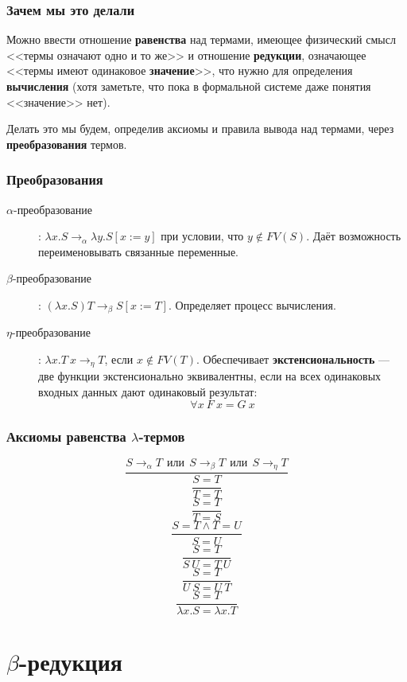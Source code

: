 \documentclass[xetex,mathserif,serif]{beamer}
\begin{document}
    \begin{frame}
        \frametitle{Зачем мы это делали}
        Можно ввести отношение \textbf{равенства} над термами, имеющее физический смысл 
        <<термы означают одно и то же>> и отношение \textbf{редукции}, означающее <<термы имеют 
        одинаковое \textbf{значение}>>, что нужно для определения \textbf{вычисления} (хотя заметьте, что пока в
        формальной системе даже понятия <<значение>> нет).
        
        Делать это мы будем, определив аксиомы и правила вывода над термами, через \textbf{преобразования}
        термов.
    \end{frame}
        
    \begin{frame}
        \frametitle{Преобразования}
        \begin{description}
            \item [$\alpha$-преобразование]: $\lambda x.S \rightarrow_\alpha 
                    \lambda y.S[x := y]$ при условии, что $y \notin FV(S)$. 
                    Даёт возможность переименовывать связанные переменные.
            \item [$\beta$-преобразование]: $(\lambda x.S) T \rightarrow_\beta S[x := T]$.
                    Определяет процесс вычисления.
            \item [$\eta$-преобразование]: $\lambda x.T\ x \rightarrow_\eta T$, 
                    если $x \notin FV(T)$. Обеспечивает	\textbf{экстенсиональность} 
                    --- две функции экстенсионально эквивалентны, если на всех
                    одинаковых входных данных дают одинаковый результат:
                    $$\forall x\ F\ x = G\ x$$
        \end{description}
    \end{frame}

    \begin{frame}
        \frametitle{Аксиомы равенства $\lambda$-термов}
        $$\dfrac{S \rightarrow_\alpha T\ \ 
            \mbox{или}\ \ S \rightarrow_\beta T\ \ 
            \mbox{или}\ \  S \rightarrow_\eta T}{S = T}$$
        $$\dfrac{}{T = T}$$
        $$\dfrac{S = T}{T = S}$$
        $$\dfrac{S = T \wedge T = U}{S = U}$$
        $$\dfrac{S = T}{S\ U = T\ U}$$
        $$\dfrac{S = T}{U\ S = U\ T}$$
        $$\dfrac{S = T}{\lambda x.S = \lambda x.T}$$
    \end{frame}
    
    \section{$\beta$-редукция}
\end{document}
